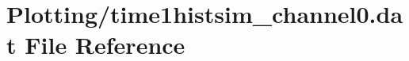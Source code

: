 \hypertarget{Plotting_2time1histsim__channel0_8dat}{}\section{Plotting/time1histsim\+\_\+channel0.dat File Reference}
\label{Plotting_2time1histsim__channel0_8dat}
